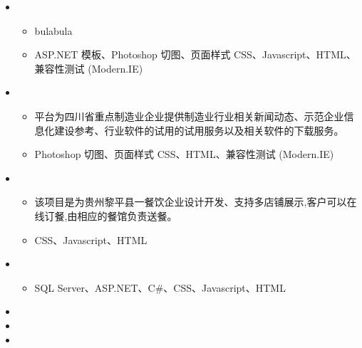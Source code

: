 \documentclass[letterpaper,11pt]{article}
\begin{document}
  \begin{itemize}
    \item
      {\footnotesize
      \begin{itemize}
        \item bulabula
        \item ASP.NET 模板、Photoshop 切图、页面样式 CSS、Javascript、HTML、兼容性测试 (Modern.IE)
      \end{itemize}
      }
    \item
      {\footnotesize
      \begin{itemize}
        \item 平台为四川省重点制造业企业提供制造业行业相关新闻动态、示范企业信息化建设参考、行业软件的试用的试用服务以及相关软件的下载服务。
        \item Photoshop 切图、页面样式 CSS、HTML、兼容性测试 (Modern.IE)
      \end{itemize}
      }
    \item
    {\footnotesize
    \begin{itemize}
      \item 该项目是为贵州黎平县一餐饮企业设计开发、支持多店铺展示,客户可以在线订餐,由相应的餐馆负责送餐。
      \item CSS、Javascript、HTML
    \end{itemize}
    }
    \item
    {\footnotesize
    \begin{itemize}
      \item SQL Server、ASP.NET、C\#、CSS、Javascript、HTML
    \end{itemize}
    }
  \end{itemize}

  \begin{itemize}
    \item {}
    \item {}
    \item {}
  \end{itemize}
\end{document}
